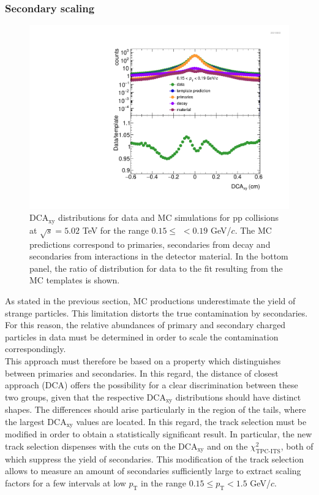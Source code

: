 \documentclass[12pt,a4paper]{report}
\begin{document}
\subsubsection{Secondary scaling}
\begin{figure}[tb!]
\centering
\includegraphics[width=12cm]{Plots/DCAdistributions.pdf}  
\caption{DCA$_\text{xy}$ distributions for data and MC simulations for pp collisions at $\sqrt{s} = 5.02$ TeV for the \pt range $0.15 \leq $ \pt $< 0.19$ GeV/$c$. The MC predictions correspond to primaries, secondaries from decay and secondaries from interactions in the detector material. In the bottom panel, the ratio of distribution for data to the fit resulting from the MC templates is shown.}
\label{secScaling}
\end{figure}
As stated in the previous section, MC productions underestimate the yield of strange particles. This limitation distorts the true contamination by secondaries. For this reason, the relative abundances of primary and secondary charged particles in data must be determined in order to scale the contamination correspondingly.\\
This approach must therefore be based on a property which distinguishes between primaries and secondaries. In this regard, the distance of closest approach (DCA) offers the possibility for a clear discrimination between these two groups, given that the respective DCA$_{\text{xy}}$ distributions should have distinct shapes. The differences should arise particularly in the region of the tails, where the largest DCA$_{\text{xy}}$ values are located. In this regard, the track selection must be modified in order to obtain a statistically significant result. In particular, the new track selection dispenses with the cuts on the DCA$_\text{xy}$ and on the  $\chi^2_\text{TPC-ITS}$, both of which suppress the yield of secondaries. This modification of the track selection allows to measure an amount of secondaries sufficiently large to extract scaling factors for a few intervals at low $p_\text{T}$ in the range $0.15 \leq p_\text{T} < 1.5 $ GeV/$c$.\\
\end{document}
